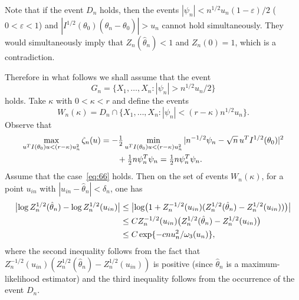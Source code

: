 \documentclass[11pt,a4paper]{article}
\begin{document}
Note that if the event $D_n$ holds, then the events $|\psi_n|<n^{1/2}u_n(1-\varepsilon)/2$ ($0<\varepsilon<1$) and $|I^{1/2}(\theta_0)(\hat\theta_n-\theta_0)|>u_n$ cannot hold simultaneously. They would simultaneously imply that $Z_n(\hat\theta_n)<1$ and $Z_n(0)=1$, which is a contradiction.

Therefore in what follows we shall assume that the event
\begin{equation}
G_n=\{X_1,\dots,X_n:|\psi_n|>n^{1/2}u_n/2\}
\label{eq:81}
\end{equation}
holds. Take $\kappa$ with $0<\kappa<r$ and define the events
\begin{equation}
W_n(\kappa)=D_n\cap\{X_1,\dots,X_n:|\psi_n|<(r-\kappa)n^{1/2}u_n\}.
\label{eq:82}
\end{equation}
Observe that
\begin{align}
\max_{u^TI(\theta_0)u<(r-\kappa)u_n^2}\zeta_n(u)
&=-\tfrac12\min_{u^TI(\theta_0)u<(r-\kappa)u_n^2}|n^{-1/2}\psi_n-\sqrt{n}\,u^TI^{1/2}(\theta_0)|^2\notag\\
&\qquad+\tfrac12 n\psi_n^T\psi_n=\tfrac12 n\psi_n^T\psi_n.
\label{eq:83}
\end{align}
Assume that the case~\eqref{eq:66} holds. Then on the set of events $W_n(\kappa)$, for a point $u_{in}$ with $|u_{in}-\hat\theta_n|<\delta_n$, one has
\begin{align}
\bigl|\log Z_n^{1/2}(\hat\theta_n)-\log Z_n^{1/2}(u_{in})\bigr|
&\le\bigl|\log\bigl(1+Z_n^{-1/2}(u_{in})(Z_n^{1/2}(\hat\theta_n)-Z_n^{1/2}(u_{in}))\bigr)\bigr|\notag\\
&\le C Z_n^{-1/2}(u_{in})\bigl(Z_n^{1/2}(\hat\theta_n)-Z_n^{1/2}(u_{in})\bigr)\notag\\
&\le C\exp\{-cnu_n^2/\omega_3(u_n)\},
\label{eq:84}
\end{align}
where the second inequality follows from the fact that $Z_n^{-1/2}(u_{in})(Z_n^{1/2}(\hat\theta_n)-Z_n^{1/2}(u_{in}))$ is positive (since $\hat\theta_n$ is a maximum-likelihood estimator) and the third inequality follows from the occurrence of the event $D_n$.
\end{document}
